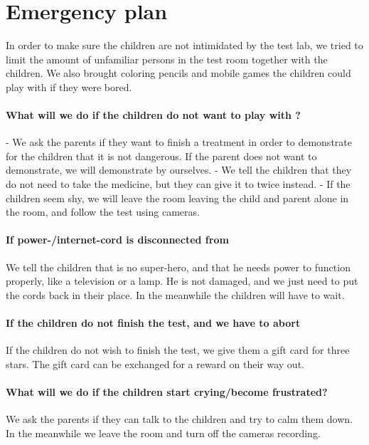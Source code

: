 \section{Emergency plan}
\label{sec:emergencyplan}
In order to make sure the children are not intimidated by the test lab, we tried to limit the amount of unfamiliar persons in the test room together with the children. We also brought coloring pencils and mobile games the children could play with if they were bored.  

\paragraph{What will we do if the children do not want to play with \ab{}?}
- We ask the parents if they want to finish a treatment in order to demonstrate for the children that it is not dangerous.
If the parent does not want to demonstrate, we will demonstrate by ourselves. 
- We tell the children that they do not need to take the medicine, but they can give it to \ab{} twice instead.
- If the children seem shy, we will leave the room leaving the child and parent alone in the room, and follow the test using cameras. 
 
\paragraph{If power-/internet-cord is disconnected from \ab{}}
We tell the children that \ab{} is no super-hero, and that he needs power to function properly, like a television or a lamp. He is not damaged, and we just need to put the cords back in their place. In the meanwhile the children will have to wait. 


\paragraph{If the children do not finish the test, and we have to abort}
If the children do not wish to finish the test, we give them a gift card for three stars. The gift card can be exchanged for a reward on their way out. 

\paragraph{What will we do if the children start crying/become frustrated?}
We ask the parents if they can talk to the children and try to calm them down. In the meanwhile we leave the room and turn off the cameras recording. 

  
